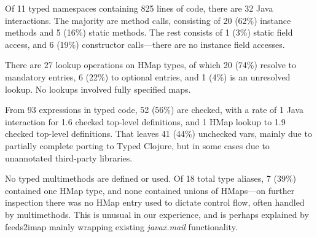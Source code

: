 Of 11 typed namespaces containing 825 lines of code, there are 32 Java interactions.
The majority are method calls, consisting of 20 (62\%) instance methods and 5 (16\%) static methods. 
The rest consists of 1 (3\%) static field access, and 6 (19\%) constructor calls---there are no instance field accesses.

There are 27 lookup operations on HMap types, of which 20 (74\%) resolve to mandatory entries, 6 (22\%) to optional entries, and 1 (4\%) is an unresolved lookup. 
No lookups involved fully specified maps.

From 93  expressions in typed code, 52 (56\%) are checked, with a rate of 1 Java interaction for 1.6 checked top-level definitions, and 1 HMap lookup to 1.9 checked top-level definitions.
That leaves 41 (44\%) unchecked vars, mainly due to partially complete porting to Typed Clojure, but in some cases due to unannotated third-party libraries.

No typed multimethods are defined or used. 
Of 18 total type aliases, 7 (39\%) contained one HMap type, and none contained unions of HMaps---on further inspection there was no HMap entry used to dictate control flow, often handled by multimethods.
This is unusual in our experience, and is perhaps explained by feeds2imap mainly wrapping existing \emph{javax.mail} functionality.

